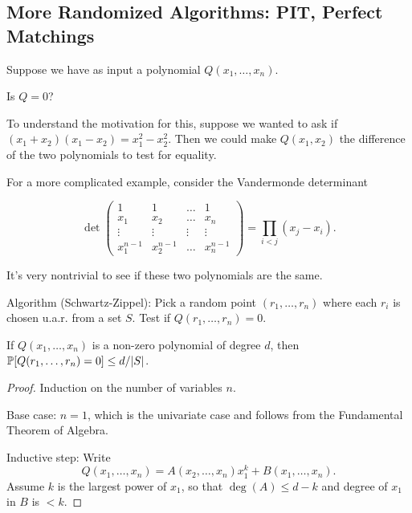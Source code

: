 \documentclass[11 pt]{scrartcl}
\begin{document}
\subsection{More Randomized Algorithms: PIT, Perfect Matchings}
\begin{example}
    Suppose we have as input a polynomial $Q(x_1, \dots, x_n)$. 

    \begin{question}
        Is $Q = 0$? 
    \end{question}
    To understand the motivation for this, suppose we wanted to ask if $(x_1+x_2)(x_1-x_2) = x_1^2 - x_2^2$. Then we could make $Q(x_1, x_2)$ the difference of the two polynomials to test for equality. 

    For a more complicated example, consider the Vandermonde determinant 

    \[ \det \begin{pmatrix} 1 & 1 & \dots & 1 \\ 
                            x_1 & x_2 & \dots & x_n \\ 
                            \vdots & \vdots & \vdots & \vdots \\ 
                            x_1^{n-1} & x_2^{n-1} & \dots & x_n^{n-1} \end{pmatrix}
                        = \prod_{i<j} (x_j-x_i).\] 

    It's very nontrivial to see if these two polynomials are the same. 

    Algorithm (Schwartz-Zippel): Pick a random point $(r_1, \dots, r_n)$ where each $r_i$ is chosen u.a.r. from a set $S$. Test if $Q(r_1, \dots, r_n) = 0$. 

    \begin{claim}
        If $Q(x_1, \dots, x_n)$ is a non-zero polynomial of degree $d$, then $\mathbb P[Q(r_1, \dots, r_n) = 0] \leq d/|S|$. 
    \end{claim}

    \begin{proof}
        Induction on the number of variables $n$. 

        Base case: $n=1$, which is the univariate case and follows from the Fundamental Theorem of Algebra.  

        Inductive step: Write 
        \[ Q(x_1, \dots, x_n) = A(x_2, \dots, x_n)x_1^k + B(x_1, \dots, x_n).\]
        Assume $k$ is the largest power of $x_1$, so that $\deg(A) \leq d-k$ and degree of $x_1$ in $B$ is $< k$. 
        

\end{proof}
\end{example}
\end{document}
